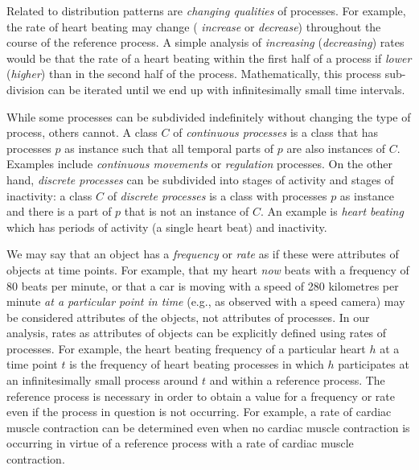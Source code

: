 \documentclass{bioinfo}
\begin{document}
Related to distribution patterns are {\em changing qualities} of
processes. For example, the rate of heart beating may change ({\em
  increase} or {\em decrease}) throughout the course of the reference
process. A simple analysis of {\em increasing} ({\em decreasing})
rates would be that the rate of a heart beating within the first half
of a process if {\em lower} ({\em higher}) than in the second half of
the process. Mathematically, this process sub-division can be iterated
until we end up with infinitesimally small time intervals.

While some processes can be subdivided indefinitely without changing
the type of process, others cannot. A class $C$ of {\em continuous
  processes} is a class that has processes $p$ as instance such that
all temporal parts of $p$ are also instances of $C$. Examples include
{\em continuous movements} or {\em regulation} processes. On the other
hand, {\em discrete processes} can be subdivided into stages of
activity and stages of inactivity: a class $C$ of {\em discrete
  processes} is a class with processes $p$ as instance and there is a
part of $p$ that is not an instance of $C$. An example is {\em heart
  beating} which has periods of activity (a single heart beat) and
inactivity.



We may say that an object has a {\em frequency} or {\em rate} as if
these were attributes of objects at time points. For example, that my
heart {\em now} beats with a frequency of 80 beats per minute, or that
a car is moving with a speed of 280 kilometres per minute {\em at a
  particular point in time} (e.g., as observed with a speed camera)
may be considered attributes of the objects, not attributes of
processes. In our analysis, rates as attributes of objects can be
explicitly defined using rates of processes. For example, the heart
beating frequency of a particular heart $h$ at a time point $t$ is the
frequency of heart beating processes in which $h$ participates at an
infinitesimally small process around $t$ and within a reference
process. The reference process is necessary in order to obtain a value
for a frequency or rate even if the process in question is not
occurring. For example, a rate of cardiac muscle contraction can be
determined even when no cardiac muscle contraction is occurring in
virtue of a reference process with a rate of cardiac muscle
contraction.
\end{document}
